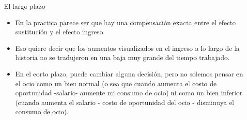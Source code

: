 \documentclass{beamer}
\begin{document}
\begin{frame}{El largo plazo}
    \begin{itemize}
        \item En la practica parece ser que hay una compensación exacta entre el efecto sustitución y el efecto ingreso.
        \item Eso quiere decir que los aumentos visualizados en el ingreso a lo largo de la historia no se tradujeron en una baja muy grande del tiempo trabajado.
        \item En el corto plazo, puede cambiar alguna decisión, pero no solemos pensar en el ocio como un bien normal (o sea que cuando aumenta el costo de oportunidad -salario- aumente mi consumo de ocio) ni como un bien inferior (cuando aumenta el salario - costo de oportunidad del ocio - disminuya el consumo de ocio).
    \end{itemize}
\end{frame}
\end{document}
